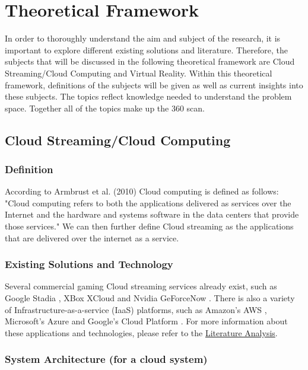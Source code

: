 \section{Theoretical Framework}

In order to thoroughly understand the aim and subject of the research, it is important to explore different existing solutions and literature. Therefore, the subjects that will be discussed in the  following theoretical framework are Cloud Streaming/Cloud Computing and Virtual Reality. Within this theoretical framework, definitions of the subjects will be given as well as current insights into these subjects. The topics reflect knowledge needed to understand the problem space. Together all of the topics make up the 360 scan.

\subsection{Cloud Streaming/Cloud Computing}

\subsubsection{Definition}
According to Armbrust et al. (2010) Cloud computing is defined as follows: 
"Cloud computing refers to both the applications delivered as services over the Internet and the hardware and systems software in the data centers that provide those services." \parencite[]{aviewoncc}
We can then further define Cloud streaming as the applications that are delivered over the internet as a service.

\subsubsection{Existing Solutions and Technology}
Several commercial gaming Cloud streaming services already exist, such as Google Stadia \parencite{stadia}, XBox XCloud \parencite{xcloud} and Nvidia GeForceNow \parencite{geforcenow}. There is also a variety of Infrastructure\hyp{}as\hyp{}a\hyp{}service (IaaS) platforms, such as Amazon's AWS \parencite{aws}, Microsoft's Azure \parencite{azure} and Google's Cloud Platform \parencite{gcp}. For more information about these applications and technologies, please refer to the \hyperref[sec:lit]{Literature Analysis}.

\subsubsection{System Architecture (for a cloud system)}


